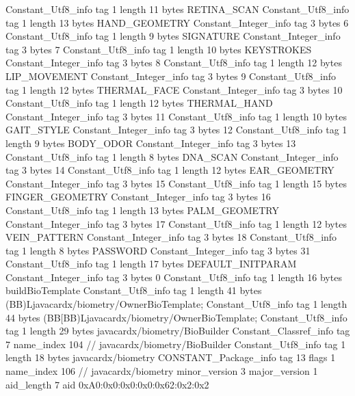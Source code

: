 {{{		}
		Constant_Utf8_info {
			tag	1
			length	11
			bytes	RETINA_SCAN
		}
		Constant_Utf8_info {
			tag	1
			length	13
			bytes	HAND_GEOMETRY
		}
		Constant_Integer_info {
			tag	3
			bytes	6
		}
		Constant_Utf8_info {
			tag	1
			length	9
			bytes	SIGNATURE
		}
		Constant_Integer_info {
			tag	3
			bytes	7
		}
		Constant_Utf8_info {
			tag	1
			length	10
			bytes	KEYSTROKES
		}
		Constant_Integer_info {
			tag	3
			bytes	8
		}
		Constant_Utf8_info {
			tag	1
			length	12
			bytes	LIP_MOVEMENT
		}
		Constant_Integer_info {
			tag	3
			bytes	9
		}
		Constant_Utf8_info {
			tag	1
			length	12
			bytes	THERMAL_FACE
		}
		Constant_Integer_info {
			tag	3
			bytes	10
		}
		Constant_Utf8_info {
			tag	1
			length	12
			bytes	THERMAL_HAND
		}
		Constant_Integer_info {
			tag	3
			bytes	11
		}
		Constant_Utf8_info {
			tag	1
			length	10
			bytes	GAIT_STYLE
		}
		Constant_Integer_info {
			tag	3
			bytes	12
		}
		Constant_Utf8_info {
			tag	1
			length	9
			bytes	BODY_ODOR
		}
		Constant_Integer_info {
			tag	3
			bytes	13
		}
		Constant_Utf8_info {
			tag	1
			length	8
			bytes	DNA_SCAN
		}
		Constant_Integer_info {
			tag	3
			bytes	14
		}
		Constant_Utf8_info {
			tag	1
			length	12
			bytes	EAR_GEOMETRY
		}
		Constant_Integer_info {
			tag	3
			bytes	15
		}
		Constant_Utf8_info {
			tag	1
			length	15
			bytes	FINGER_GEOMETRY
		}
		Constant_Integer_info {
			tag	3
			bytes	16
		}
		Constant_Utf8_info {
			tag	1
			length	13
			bytes	PALM_GEOMETRY
		}
		Constant_Integer_info {
			tag	3
			bytes	17
		}
		Constant_Utf8_info {
			tag	1
			length	12
			bytes	VEIN_PATTERN
		}
		Constant_Integer_info {
			tag	3
			bytes	18
		}
		Constant_Utf8_info {
			tag	1
			length	8
			bytes	PASSWORD
		}
		Constant_Integer_info {
			tag	3
			bytes	31
		}
		Constant_Utf8_info {
			tag	1
			length	17
			bytes	DEFAULT_INITPARAM
		}
		Constant_Integer_info {
			tag	3
			bytes	0
		}
		Constant_Utf8_info {
			tag	1
			length	16
			bytes	buildBioTemplate
		}
		Constant_Utf8_info {
			tag	1
			length	41
			bytes	(BB)Ljavacardx/biometry/OwnerBioTemplate;
		}
		Constant_Utf8_info {
			tag	1
			length	44
			bytes	(BB[BB)Ljavacardx/biometry/OwnerBioTemplate;
		}
		Constant_Utf8_info {
			tag	1
			length	29
			bytes	javacardx/biometry/BioBuilder
		}
		Constant_Classref_info {
			tag	7
			name_index	104		// javacardx/biometry/BioBuilder
		}
		Constant_Utf8_info {
			tag	1
			length	18
			bytes	javacardx/biometry
		}
		CONSTANT_Package_info {
			tag	13
			flags	1
			name_index	106		// javacardx/biometry
			minor_version	3
			major_version	1
			aid_length	7
			aid	0xA0:0x0:0x0:0x0:0x62:0x2:0x2
}}}
